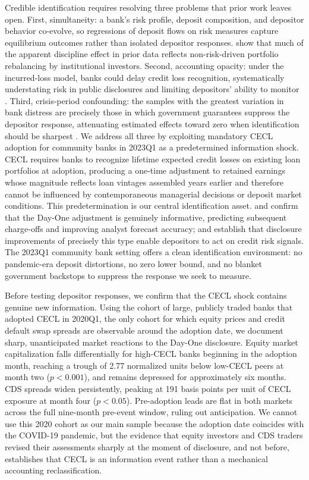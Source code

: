 Credible identification requires resolving three problems that prior work leaves
open.  First, simultaneity: a bank's risk profile, deposit composition, and
depositor behavior co-evolve, so regressions of deposit flows on risk measures
capture equilibrium outcomes rather than isolated depositor responses.
\citet{covitz2004market} show that much of the apparent discipline effect in prior
data reflects non-risk-driven portfolio rebalancing by institutional investors.
Second, accounting opacity: under the incurred-loss model, banks could delay
credit loss recognition, systematically understating risk in public disclosures
and limiting depositors' ability to monitor
\citep{bushman2012accounting, bushman2015delayed}.  Third, crisis-period
confounding: the samples with the greatest variation in bank distress are
precisely those in which government guarantees suppress the depositor response,
attenuating estimated effects toward zero when identification should be sharpest
\citep{bennett2015market}.  We address all three by exploiting mandatory CECL
adoption for community banks in 2023Q1 as a predetermined information shock.
CECL requires banks to recognize lifetime expected credit losses on existing loan
portfolios at adoption, producing a one-time adjustment to retained earnings
whose magnitude reflects loan vintages assembled years earlier and therefore
cannot be influenced by contemporaneous managerial decisions or deposit market
conditions.  This predetermination is our central identification asset.
\citet{kim2026current} and \citet{gee2022decision} confirm that the Day-One
adjustment is genuinely informative, predicting subsequent charge-offs and
improving analyst forecast accuracy; \citet{nier2006market} and
\citet{chen2022bank} establish that disclosure improvements of precisely this
type enable depositors to act on credit risk signals.  The 2023Q1 community bank
setting offers a clean identification environment: no pandemic-era deposit
distortions, no zero lower bound, and no blanket government backstops to suppress
the response we seek to measure.

Before testing depositor responses, we confirm that the CECL shock contains
genuine new information.  Using the cohort of large, publicly traded banks that
adopted CECL in 2020Q1, the only cohort for which equity prices and credit
default swap spreads are observable around the adoption date, we document sharp,
unanticipated market reactions to the Day-One disclosure.  Equity market
capitalization falls differentially for high-CECL banks beginning in the adoption
month, reaching a trough of 2.77 normalized units below low-CECL peers at month
two ($p < 0.001$), and remains depressed for approximately six months.  CDS
spreads widen persistently, peaking at 191 basis points per unit of CECL exposure
at month four ($p < 0.05$).  Pre-adoption leads are flat in both markets across
the full nine-month pre-event window, ruling out anticipation.  We cannot use
this 2020 cohort as our main sample because the adoption date coincides with the
COVID-19 pandemic, but the evidence that equity investors and CDS traders revised
their assessments sharply at the moment of disclosure, and not before, establishes
that CECL is an information event rather than a mechanical accounting
reclassification.

